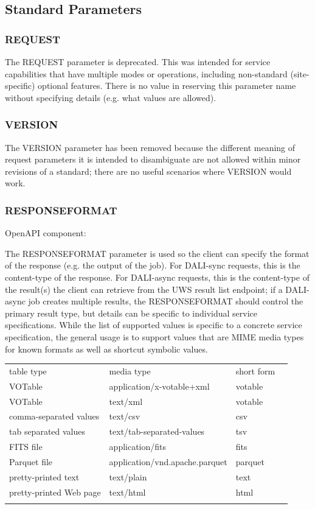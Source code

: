 \documentclass[11pt,letter]{ivoa}
\begin{document}
\subsection{Standard Parameters}

\subsubsection{REQUEST}
The REQUEST parameter is deprecated. This was intended for service capabilities
that have multiple modes or operations, including non-standard (site-specific)
optional features. There is no value in reserving this parameter name without
specifying details (e.g. what values are allowed).

\subsubsection{VERSION}
The VERSION parameter has been removed because the different
meaning of request
parameters it is intended to disambiguate are not allowed within minor
revisions of a standard; there are no useful scenarios where VERSION would work.

\subsubsection{RESPONSEFORMAT}
\label{sec:RESPONSEFORMAT}
OpenAPI component:\\ 

The RESPONSEFORMAT parameter is used so the client can specify the format of the
response (e.g. the output of the job). For DALI-sync requests, this is the
content-type of the response. For DALI-async requests, this is the content-type
of the result(s) the client can retrieve from the UWS result list
endpoint; if a DALI-async job creates multiple results, the RESPONSEFORMAT
should control the primary result type, but details can be specific to
individual service specifications. While the list of supported values is
specific to a concrete service specification, the general usage is to support
values that are MIME media types \citep{std:MIME} for known
formats as well as
shortcut symbolic values.

\noindent
\begin{tabular}{l l l l}
\sptablerule
table type & media type & short form \\
\sptablerule
VOTable & application/x-votable+xml & votable \\
VOTable & text/xml & votable \\
comma-separated values & text/csv & csv \\
tab separated values & text/tab-separated-values & tsv \\
FITS file & application/fits & fits \\
Parquet file & application/vnd.apache.parquet & parquet \\
pretty-printed text & text/plain & text \\
pretty-printed Web page & text/html & html \\
\sptablerule
\label{tab:mimetypes}
\end{tabular}
\end{document}
